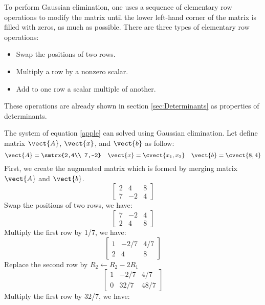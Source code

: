 To perform Gaussian elimination, one uses a sequence of elementary row operations to modify the matrix until the lower left-hand corner of the matrix is filled with zeros, as much as possible. There are three types of elementary row operations:
\begin{itemize}
\item Swap the positions of two rows.
\item Multiply a row by a nonzero scalar.
\item Add to one row a scalar multiple of another.
\end{itemize}
These operations are already shown in section \ref{sec:Determinants} as properties of determinants.\par 
\begin{example}
The system of equation \eqref{apple} can solved using Gaussian elimination. Let define matrix $\vect{A}$, $\vect{x}$, and $\vect{b}$ as follow:
\[ \vect{A}=\smtrx{2,4\\ 7,-2} \quad \vect{x}=\cvect{x_1,x_2} \quad \vect{b}=\cvect{8,4} \] 
First, we create the augmented matrix which is formed by merging matrix $\vect{A}$ and $\vect{b}$.
\begin{equation*}
    \left[{\begin{array}{cc|c}
        2&4&8 \\ 7&-2&4
    \end{array}}\right]
\end{equation*}
Swap the positions of two rows, we have:
\begin{equation*}
    \left[{\begin{array}{cc|c}
        7&-2&4 \\ 2&4&8
    \end{array}}\right]
\end{equation*}
Multiply the first row by 1/7, we have:
\begin{equation*}
    \left[{\begin{array}{cc|c}
        1&-2/7&4/7 \\ 2&4&8
    \end{array}}\right]
\end{equation*}
Replace the second row by $R_2 \leftarrow R_2-2R_1$
\begin{equation*}
    \left[{\begin{array}{cc|c}
        1&-2/7&4/7 \\ 0&32/7&48/7
    \end{array}}\right]
\end{equation*}
Multiply the first row by 32/7, we have:

\end{example}
